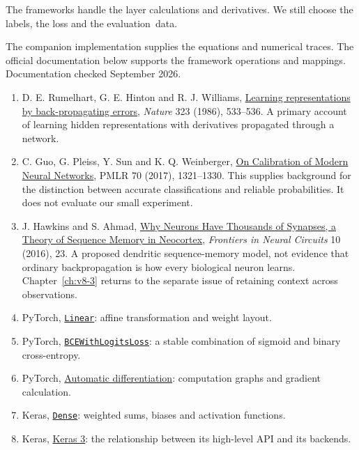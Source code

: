 The frameworks handle the layer calculations and derivatives. We still choose the labels, the loss and the evaluation~data.





\clearpage
\fontsize{10}{12.5}\selectfont
{}

The companion implementation supplies the equations and numerical traces. The official documentation below supports the framework operations and mappings. Documentation checked September 2026.
\begin{enumerate}
\item D. E. Rumelhart, G. E. Hinton and R. J. Williams, \href{https://doi.org/10.1038/323533a0}{Learning representations by back-propagating errors}, \emph{Nature} 323 (1986), 533--536. A primary account of learning hidden representations with derivatives propagated through a network.
\item C. Guo, G. Pleiss, Y. Sun and K. Q. Weinberger, \href{https://proceedings.mlr.press/v70/guo17a.html}{On Calibration of Modern Neural Networks}, PMLR 70 (2017), 1321--1330. This supplies background for the distinction between accurate classifications and reliable probabilities. It does not evaluate our small experiment.
\item J. Hawkins and S. Ahmad, \href{https://doi.org/10.3389/fncir.2016.00023}{Why Neurons Have Thousands of Synapses, a Theory of Sequence Memory in Neocortex}, \emph{Frontiers in Neural Circuits} 10 (2016), 23. A proposed dendritic sequence-memory model, not evidence that ordinary backpropagation is how every biological neuron learns. Chapter~\ref{ch:v8-3} returns to the separate issue of retaining context across observations.
\item PyTorch, \href{https://docs.pytorch.org/docs/2.14/generated/torch.nn.Linear.html}{\texttt{Linear}}: affine transformation and weight layout.
\item PyTorch, \href{https://docs.pytorch.org/docs/2.14/generated/torch.nn.BCEWithLogitsLoss.html}{\texttt{BCEWithLogitsLoss}}: a stable combination of sigmoid and binary cross-entropy.
\item PyTorch, \href{https://docs.pytorch.org/tutorials/beginner/basics/autogradqs_tutorial.html}{Automatic differentiation}: computation graphs and gradient calculation.
\item Keras, \href{https://keras.io/api/layers/core_layers/dense/}{\texttt{Dense}}: weighted sums, biases and activation functions.
\item Keras, \href{https://keras.io/keras_3/}{Keras 3}: the relationship between its high-level API and its backends.

\end{enumerate}
